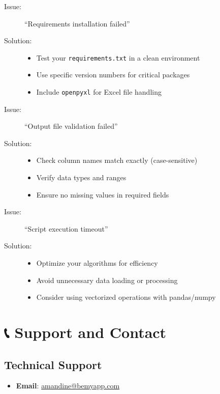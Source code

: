 \documentclass[11pt,a4paper]{article}
\begin{document}
\begin{description}
    \item[Issue:] ``Requirements installation failed''
    \item[Solution:] \hfill
    \begin{itemize}
        \item Test your \texttt{requirements.txt} in a clean environment
        \item Use specific version numbers for critical packages
        \item Include \texttt{openpyxl} for Excel file handling
    \end{itemize}
    
    \item[Issue:] ``Output file validation failed''
    \item[Solution:] \hfill
    \begin{itemize}
        \item Check column names match exactly (case-sensitive)
        \item Verify data types and ranges
        \item Ensure no missing values in required fields
    \end{itemize}
    
    \item[Issue:] ``Script execution timeout''
    \item[Solution:] \hfill
    \begin{itemize}
        \item Optimize your algorithms for efficiency
        \item Avoid unnecessary data loading or processing
        \item Consider using vectorized operations with pandas/numpy
    \end{itemize}
\end{description}

\section*{📞 Support and Contact}

\subsection*{Technical Support}
\begin{itemize}
    \item \textbf{Email}: \href{mailto:amandine@bemyapp.com}{amandine@bemyapp.com}
\end{itemize}
\end{document}
